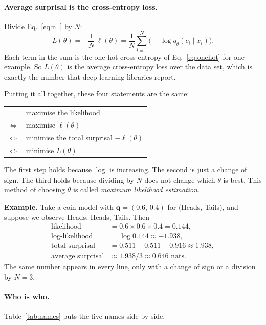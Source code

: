 \documentclass[12pt,a4paper]{article}
\begin{document}
\paragraph{Average surprisal is the cross-entropy loss.}
Divide Eq.~\eqref{eq:nll} by $N$:
\begin{equation}
  \bar{L}(\theta)
  = -\frac{1}{N}\,\ell(\theta)
  = \frac{1}{N}\sum_{i=1}^{N} \big(-\log q_\theta(c_i \mid x_i)\big).
  \label{eq:meanloss}
\end{equation}
Each term in the sum is the one-hot cross-entropy of
Eq.~\eqref{eq:onehot} for one example. So $\bar{L}(\theta)$
is the average cross-entropy loss over the data set, which
is exactly the number that deep learning libraries report.

Putting it all together, these four statements are the
same:
\begin{center}
\begin{tabular}{rl}
         & maximise the likelihood \\[2pt]
$\iff$   & maximise $\ell(\theta)$ \\[2pt]
$\iff$   & minimise the total surprisal $-\ell(\theta)$ \\[2pt]
$\iff$   & minimise $\bar{L}(\theta)$.
\end{tabular}
\end{center}
The first step holds because $\log$ is increasing. The
second is just a change of sign. The third holds because
dividing by $N$ does not change which $\theta$ is best.
This method of choosing $\theta$ is called
\emph{maximum likelihood estimation}.

\textbf{Example.} Take a coin model with
$\symbf{q} = (0.6,\, 0.4)$ for (Heads, Tails), and suppose
we observe Heads, Heads, Tails. Then
\begin{align*}
  \text{likelihood} &= 0.6 \times 0.6 \times 0.4 = 0.144, \\
  \text{log-likelihood} &= \log 0.144 \approx -1.938, \\
  \text{total surprisal} &= 0.511 + 0.511 + 0.916 \approx 1.938, \\
  \text{average surprisal} &\approx 1.938 / 3 \approx 0.646 \text{ nats}.
\end{align*}
The same number appears in every line, only with a change
of sign or a division by $N = 3$.

\paragraph{Who is who.}
Table~\ref{tab:names} puts the five names side by side.
\end{document}
